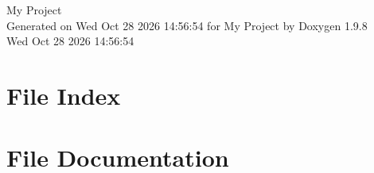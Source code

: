 \documentclass[twoside]{book}
\newcommand{\+}{\discretionary{\mbox{\scriptsize$\hookleftarrow$}}{}{}}
\newcommand{\clearemptydoublepage}{%
    \newpage{\pagestyle{empty}\cleardoublepage}%
  }
\begin{document}
  \raggedbottom
    \hypersetup{pageanchor=false,
                bookmarksnumbered=true,
                pdfencoding=unicode
               }
  \begin{titlepage}
  \vspace*{7cm}
  \begin{center}%
  {\Large My Project}\\
  \vspace*{1cm}
  {\large Generated on Wed Oct 28 2026 14\+:56\+:54 for My Project by Doxygen 1.9.8}\\
    \vspace*{0.5cm}
    {\small Wed Oct 28 2026 14:56:54}
  \end{center}
  \end{titlepage}
  \clearemptydoublepage
  \tableofcontents
  \clearemptydoublepage
  \hypersetup{pageanchor=true}

\chapter{File Index}

\chapter{File Documentation}


  \backmatter
  \newpage
  \clearemptydoublepage
  \printindex
\end{document}
